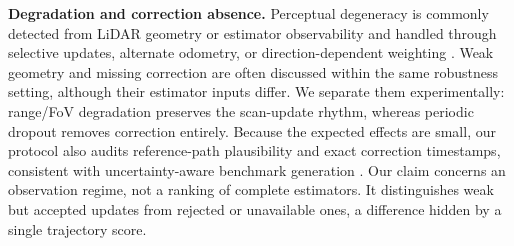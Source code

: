 \textbf{Degradation and correction absence.}
Perceptual degeneracy is commonly detected from LiDAR geometry or estimator
observability and handled through selective updates, alternate odometry, or
direction-dependent weighting \cite{tagliabue2021lion,yao2025d2lio}. Weak
geometry and missing correction are often discussed within the same robustness
setting, although their estimator inputs differ. We separate them
experimentally: range/FoV degradation preserves the scan-update rhythm,
whereas periodic dropout removes correction entirely. Because the expected
effects are small, our protocol also audits reference-path plausibility and
exact correction timestamps, consistent with uncertainty-aware benchmark
generation \cite{hu2024paloc}. Our claim concerns an observation regime, not a
ranking of complete estimators. It distinguishes weak but accepted updates
from rejected or unavailable ones, a difference hidden by a single trajectory
score.
